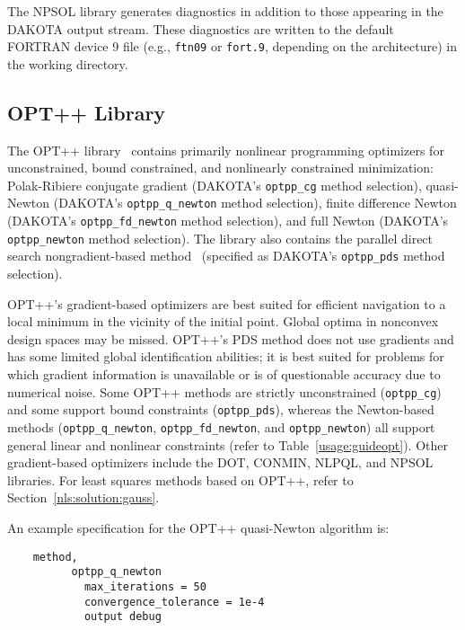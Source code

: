 The NPSOL library generates diagnostics in addition to those appearing
in the DAKOTA output stream. These diagnostics are written to the
default FORTRAN device 9 file (e.g., \texttt{ftn09} or \texttt{fort.9},
depending on the architecture) in the working directory.

\subsection{OPT++ Library}\label{opt:software:optpp}

The OPT++ library~\cite{MeOlHoWi07} contains primarily nonlinear programming
optimizers for unconstrained, bound constrained, and nonlinearly
constrained minimization: Polak-Ribiere conjugate gradient (DAKOTA's
\texttt{optpp\_cg} method selection), quasi-Newton (DAKOTA's
\texttt{optpp\_q\_newton} method selection), finite difference Newton
(DAKOTA's \texttt{optpp\_fd\_newton} method selection), and full
Newton (DAKOTA's \texttt{optpp\_newton} method selection). The library
also contains the parallel direct search nongradient-based
method~\cite{Den94b} (specified as DAKOTA's \texttt{optpp\_pds} method
selection).

OPT++'s gradient-based optimizers are best suited for efficient
navigation to a local minimum in the vicinity of the initial point.
Global optima in nonconvex design spaces may be missed. OPT++'s PDS
method does not use gradients and has some limited global
identification abilities; it is best suited for problems for which
gradient information is unavailable or is of questionable accuracy due
to numerical noise. Some OPT++ methods are strictly unconstrained
(\texttt{optpp\_cg}) and some support bound constraints
(\texttt{optpp\_pds}), whereas the Newton-based methods
(\texttt{optpp\_q\_newton}, \texttt{optpp\_fd\_newton}, and
\texttt{optpp\_newton}) all support general linear and nonlinear
constraints (refer to Table~\ref{usage:guideopt}). Other
gradient-based optimizers include the DOT, CONMIN, NLPQL, and NPSOL
libraries. For least squares methods based on OPT++, refer to
Section~\ref{nls:solution:gauss}.

An example specification for the OPT++ quasi-Newton algorithm is:
\begin{small}
\begin{verbatim}
    method,
          optpp_q_newton
            max_iterations = 50
            convergence_tolerance = 1e-4
            output debug
\end{verbatim}
\end{small}

